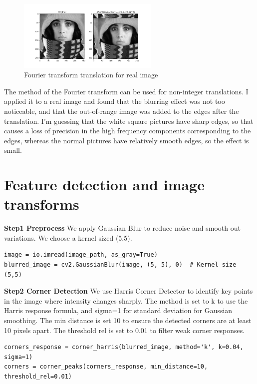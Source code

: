 \documentclass[12pt]{article}
\begin{document}
\subsection{}
\begin{figure}[ht]
    \centering
    \includegraphics[width=0.6\textwidth]{pics/a6_1.8.png} 
    \caption{Fourier transform translation for real image}
\end{figure}
The method of the Fourier transform can be used for non-integer translations. I applied it to a real image and found that the blurring effect was not too noticeable, and that the out-of-range image was added to the edges after the translation.
I'm guessing that the white square pictures have sharp edges, so that causes a loss of precision in the high frequency components corresponding to the edges, whereas the normal pictures have relatively smooth edges, so the effect is small.
\section{Feature detection and image transforms}
\textbf{Step1 Preprocess}
We apply Gaussian Blur to reduce noise and smooth out variations. We choose a kernel sized (5,5).
\begin{lstlisting}
image = io.imread(image_path, as_gray=True)
blurred_image = cv2.GaussianBlur(image, (5, 5), 0)  # Kernel size (5,5)
\end{lstlisting}


\textbf{Step2 Corner Detection}
We use Harris Corner Detector to identify key points in the image where intensity changes sharply. The method is set to k to use the Harris response formula, and sigma=1 for standard deviation for Gaussian smoothing. The min distance is set 10 to ensure the detected corners are at least 10 pixels apart. The threshold rel is set to 0.01 to filter weak corner responses.
\begin{lstlisting}
corners_response = corner_harris(blurred_image, method='k', k=0.04, sigma=1)
corners = corner_peaks(corners_response, min_distance=10, threshold_rel=0.01)
\end{lstlisting}
\end{document}

